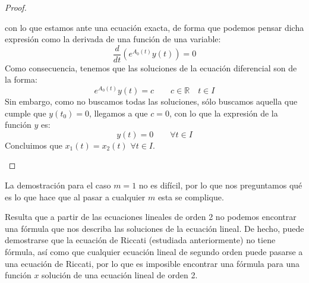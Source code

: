 \begin{prop}
\begin{proof}
\begin{description}
                con lo que estamos ante una ecuación exacta, de forma que podemos pensar dicha expresión como la derivada de una función de una variable:
                \begin{equation*}
                    \dfrac{d}{dt}\left(e^{A_0(t)}y(t)\right) = 0
                \end{equation*}
                Como consecuencia, tenemos que las soluciones de la ecuación diferencial son de la forma:
                \begin{equation*}
                    e^{A_0(t)} y(t) = c \qquad c\in \mathbb{R} \quad t\in I
                \end{equation*}
                Sin embargo, como no buscamos todas las soluciones, sólo buscamos aquella que cumple que $y(t_0) = 0$, llegamos a que $c = 0$, con lo que la expresión de la función $y$ es:
                \begin{equation*}
                    y(t) = 0 \qquad \forall t\in I
                \end{equation*}
                Concluimos que $x_1(t) = x_2(t)$ $\forall t\in I$.
        \end{description}
    \end{proof}
\end{prop}

La demostración para el caso $m=1$ no es difícil, por lo que nos preguntamos qué es lo que hace que al pasar a cualquier $m$ esta se complique.

Resulta que a partir de las ecuaciones lineales de orden 2 no podemos encontrar una fórmula que nos describa las soluciones de la ecuación lineal. De hecho, puede demostrarse que la ecuación de Riccati (estudiada anteriormente) no tiene fórmula, así como que cualquier ecuación lineal de segundo orden puede pasarse a una ecuación de Riccati, por lo que es imposible encontrar una fórmula para una función $x$ solución de una ecuación lineal de orden 2.
